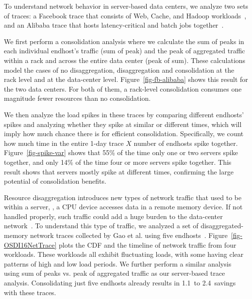 To understand network behavior in server-based data centers, we analyze two sets of traces: a Facebook trace that consists of Web, Cache, and Hadoop workloads~\cite{facebook-sigcomm15}, and an Alibaba trace that hosts latency-critical and batch jobs together~\cite{alibaba-trace}. 

We first perform a consolidation analysis where we calculate the sum of peaks in each individual endhost's traffic (sum of peak) and the peak of aggregated traffic within a rack and across the entire data center (peak of sum). 
These calculations model the cases of no disaggregation, disaggregation and consolidation at the rack level and at the data-center level.
Figure~\ref{fig-fb-alibaba} shows this result for the two data centers. 
For both of them, a rack-level consolidation consumes one magnitude fewer resources than no consolidation.

We then analyze the load spikes in these traces
by comparing different endhosts' spikes and analyzing whether they spike at similar or different times, which will imply how much chance there is for efficient consolidation.
Specifically, we count how much time in the entire 1-day trace $X$ number of endhosts spike together.
Figure~\ref{fig-spike-var} shows that 55\% of the time only one or two servers spike together, and only 14\% of the time four or more servers spike together.
This result shows that servers mostly spike at different times, confirming the large potential of consolidation benefits.



Resource disaggregation introduces new types of network traffic that used to be within a server, \eg, a CPU device accesses data in a remote memory device. 
If not handled properly, such traffic could add a huge burden to the data-center network~\cite{sirius-sigcomm20}.
To understand this type of traffic, we analyzed a set of disaggregated-memory network traces collected by Gao et al. using five endhosts~\cite{Gao16-OSDI}.
Figure~\ref{fig-OSDI16NetTrace} plots the CDF and the timeline of network traffic from four workloads.
These workloads all exhibit fluctuating loads, with some having clear patterns of high and low load periods.
We further perform a similar analysis using sum of peaks vs. peak of aggregated traffic as our server-based trace analysis.
Consolidating just five endhosts already results in 1.1\x\ to 2.4\x\ savings with these traces.


